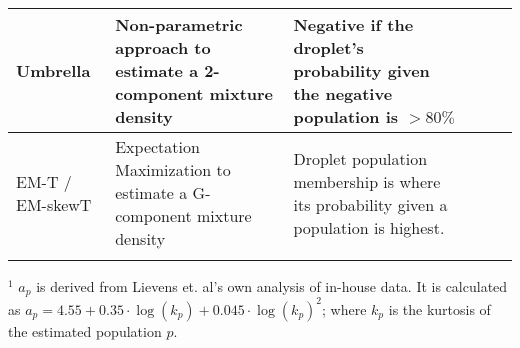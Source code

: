 \begin{table}
\begin{tabularx}{\textwidth}{p{2.7cm}*{5}{X}}
        \hline
        Umbrella                                                     & Non-parametric approach to estimate a 2-component mixture density                                                                                        & Negative if the droplet’s probability   given the negative population is \(> 80\%\)                                                                                                             \\ 
        \hline
        EM-T / \newline EM-skewT    & Expectation Maximization to estimate a G-component mixture density                                                                                       & Droplet population membership is where its probability given a population is highest.                                                                                                           \\ 
        \arrayrulecolor{black}
        \bottomrule    
    \end{tabularx}
    {\footnotesize \(^1\) \(a_p\) is derived from Lievens et. al's own analysis of in-house data. It is calculated as \(a_p = 4.55 + 0.35 \cdot \log{(k_p)}+0.045 \cdot \log{(k_p)}^2\); where \(k_p\) is the kurtosis of the estimated population \(p\).}
\end{table}

